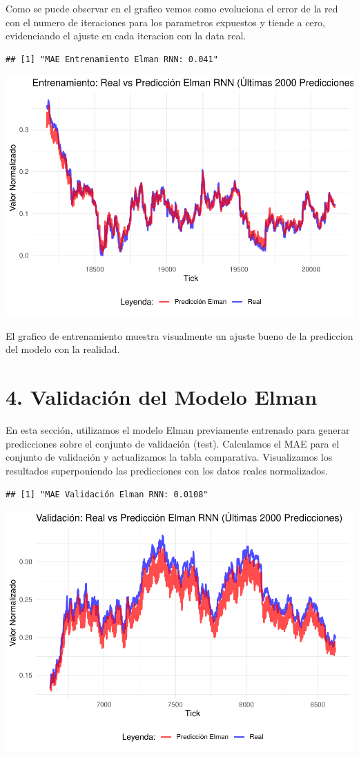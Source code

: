 \documentclass[
]{book}
\begin{document}
Como se puede observar en el grafico vemos como evoluciona el error de la red con el numero de iteraciones para los parametros expuestos y tiende a cero, evidenciando el ajuste en cada iteracion con la data real.

\begin{verbatim}
## [1] "MAE Entrenamiento Elman RNN: 0.041"
\end{verbatim}

\includegraphics{bookdown_time_series_files/figure-latex/rnn-4-1.pdf}

El grafico de entrenamiento muestra visualmente un ajuste bueno de la prediccion del modelo con la realidad.

\section{4. Validación del Modelo Elman}\label{validaciuxf3n-del-modelo-elman}

En esta sección, utilizamos el modelo Elman previamente entrenado para generar predicciones sobre el conjunto de validación (test). Calculamos el MAE para el conjunto de validación y actualizamos la tabla comparativa. Visualizamos los resultados superponiendo las predicciones con los datos reales normalizados.

\begin{verbatim}
## [1] "MAE Validación Elman RNN: 0.0108"
\end{verbatim}

\includegraphics{bookdown_time_series_files/figure-latex/rnn-5-1.pdf}
\end{document}
